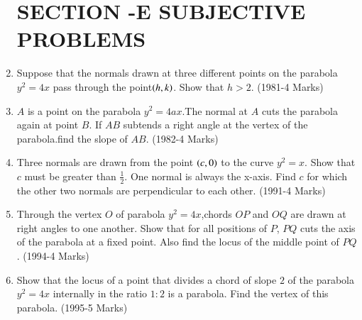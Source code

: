 \documentclass[journal,12pt,onecolumn]{IEEEtran}
\theoremstyle{remark}
\begin{document}
\begin{enumerate}
		\section{SECTION -E SUBJECTIVE PROBLEMS}
	\item Suppose that the normals drawn at three different points on the parabola $y^2=4x$ pass through the point$\left(h,k\right)$. Show that $h>2$. 
		\hfill(1981-4 Marks)
		
	\item $A$ is a point on the parabola $y^2=4ax$.The normal at $A$ cuts the parabola again at point $B$. If $AB$ subtends a right angle at the vertex of the parabola.find the slope of $AB$.  
		\hfill(1982-4 Marks)
		
	\item Three normals are drawn from the point $\left(c,0\right)$ to the curve $y^2=x$. Show that $c$ must be greater than $\frac{1}{2}$. One normal is always the x-axis. Find $c$ for which the other two normals are perpendicular to each other. 
	      \hfill(1991-4 Marks)
		
	\item Through the vertex $O$ of parabola $y^2=4x$,chords $OP$ and $OQ$ are drawn at right angles to one another. Show that for all positions of $P$, $PQ$ cuts the axis of the parabola at a fixed point. Also find the locus of the middle point of $PQ$. 
		\hfill(1994-4 Marks)
		
      \item Show that the locus of a point that divides a chord of slope $2$ of the parabola $y^2=4x$ internally in the ratio $1:2$ is a parabola. Find the vertex of this parabola. 
	      \hfill(1995-5 Marks)


\end{enumerate}
\end{document}
